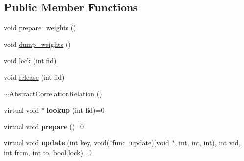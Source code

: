 \subsection*{Public Member Functions}
\begin{DoxyCompactItemize}
\item 
void \hyperlink{classmia_1_1elly_1_1dstruct_1_1_abstract_correlation_relation_a86990596212576f10e6a589fb1eb46b7}{prepare\-\_\-weights} ()
\item 
void \hyperlink{classmia_1_1elly_1_1dstruct_1_1_abstract_correlation_relation_a9d6015d4805d9612d922a1311c2604c3}{dump\-\_\-weights} ()
\item 
void \hyperlink{classmia_1_1elly_1_1dstruct_1_1_abstract_correlation_relation_a3291f1afe2252b5bc97414a96c035505}{lock} (int fid)
\item 
void \hyperlink{classmia_1_1elly_1_1dstruct_1_1_abstract_correlation_relation_a1f81a8c581593c2c5a471687d6369214}{release} (int fid)
\item 
\hyperlink{classmia_1_1elly_1_1dstruct_1_1_abstract_correlation_relation_af6f78017f5af971958660bb946d64171}{$\sim$\-Abstract\-Correlation\-Relation} ()
\item 
\hypertarget{classmia_1_1elly_1_1dstruct_1_1_abstract_correlation_relation_a6fb8ddb076966b2b63be7fbc7b020452}{virtual void $\ast$ {\bfseries lookup} (int fid)=0}\label{classmia_1_1elly_1_1dstruct_1_1_abstract_correlation_relation_a6fb8ddb076966b2b63be7fbc7b020452}

\item 
\hypertarget{classmia_1_1elly_1_1dstruct_1_1_abstract_correlation_relation_a5a783db4f6a78f73a477a80fc51d1c6c}{virtual void {\bfseries prepare} ()=0}\label{classmia_1_1elly_1_1dstruct_1_1_abstract_correlation_relation_a5a783db4f6a78f73a477a80fc51d1c6c}

\item 
\hypertarget{classmia_1_1elly_1_1dstruct_1_1_abstract_correlation_relation_af923ccef57327a22857ade9059863e89}{virtual void {\bfseries update} (int key, void($\ast$func\-\_\-update)(void $\ast$, int, int, int), int vid, int from, int to, bool \hyperlink{classmia_1_1elly_1_1dstruct_1_1_abstract_correlation_relation_a3291f1afe2252b5bc97414a96c035505}{lock})=0}\label{classmia_1_1elly_1_1dstruct_1_1_abstract_correlation_relation_af923ccef57327a22857ade9059863e89}

\end{DoxyCompactItemize}
